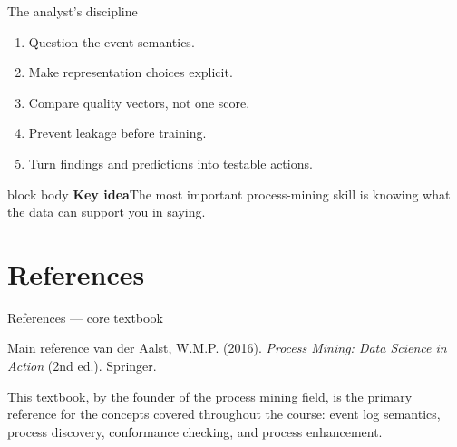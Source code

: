 \documentclass[aspectratio=169,11pt]{beamer}
\newcommand{\coursename}{Process Mining}
\newcommand{\instructor}{Sylvio Barbon Junior}
\newcommand{\keyidea}[1]{%
  \begin{beamercolorbox}[rounded=true,sep=0.65em]{block body}
    \textbf{\color{Teal}Key idea}\quad #1
  \end{beamercolorbox}
}
\begin{document}
\begin{frame}{The analyst's discipline}
  \Large
  \begin{enumerate}
    \item Question the event semantics.
    \item Make representation choices explicit.
    \item Compare quality vectors, not one score.
    \item Prevent leakage before training.
    \item Turn findings and predictions into testable actions.
  \end{enumerate}
  \vspace{0.35cm}
  \keyidea{The most important process-mining skill is knowing what the data can
  support you in saying.}
\end{frame}

\begin{frame}[plain]
\end{frame}

\section{References}

\begin{frame}{References — core textbook}
  \begin{block}{Main reference}
    van der Aalst, W.M.P. (2016). \textit{Process Mining: Data Science in
    Action} (2nd ed.). Springer.
  \end{block}
  \vspace{0.4cm}
  This textbook, by the founder of the process mining field, is the primary
  reference for the concepts covered throughout the course: event log
  semantics, process discovery, conformance checking, and process
  enhancement.
\end{frame}
\end{document}
